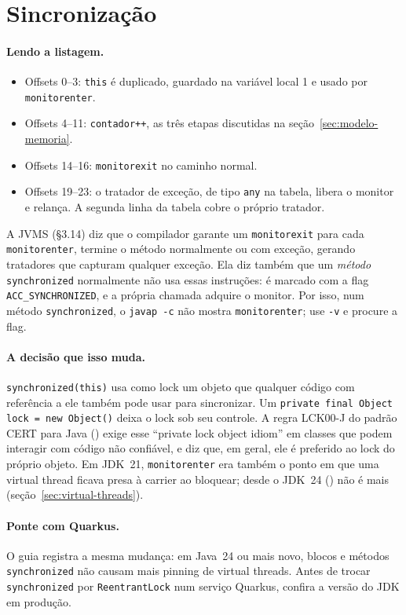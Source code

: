\section{Sincronização}
\label{sec:sincronizacao}




\paragraph{Lendo a listagem.}
\begin{itemize}
\item Offsets 0--3: \texttt{this} é duplicado, guardado na variável
  local 1 e usado por \texttt{monitorenter}.
\item Offsets 4--11: \texttt{contador++}, as três etapas discutidas na
  seção~\ref{sec:modelo-memoria}.
\item Offsets 14--16: \texttt{monitorexit} no caminho normal.
\item Offsets 19--23: o tratador de exceção, de tipo \texttt{any} na
  tabela, libera o monitor e relança. A segunda linha da tabela cobre o
  próprio tratador.
\end{itemize}

A JVMS (§3.14) diz que o compilador garante um \texttt{monitorexit} para
cada \texttt{monitorenter}, termine o método normalmente ou com exceção,
gerando tratadores que capturam qualquer exceção. Ela diz também que um
\emph{método} \texttt{synchronized} normalmente não usa essas instruções:
é marcado com a flag \texttt{ACC\_SYNCHRONIZED}, e a própria chamada
adquire o monitor. Por isso, num método \texttt{synchronized}, o
\texttt{javap -c} não mostra \texttt{monitorenter}; use \texttt{-v} e
procure a flag.

\paragraph{A decisão que isso muda.}
\texttt{synchronized(this)} usa como lock um objeto que qualquer código
com referência a ele também pode usar para sincronizar. Um
\texttt{private final Object lock = new Object()} deixa o lock sob seu
controle. A regra LCK00-J do padrão CERT para Java
() exige esse \enquote{private lock object
idiom} em classes que podem interagir com código não confiável, e diz
que, em geral, ele é preferido ao lock do próprio objeto. Em JDK~21, \texttt{monitorenter} era também o ponto em que uma
virtual thread ficava presa à carrier ao bloquear; desde o JDK~24
() não é mais (seção~\ref{sec:virtual-threads}).

\paragraph{Ponte com Quarkus.}
O guia  registra a mesma mudança:
em Java~24 ou mais novo, blocos e métodos \texttt{synchronized} não
causam mais pinning de virtual threads. Antes
de trocar \texttt{synchronized} por \texttt{ReentrantLock} num serviço
Quarkus, confira a versão do JDK em produção.
